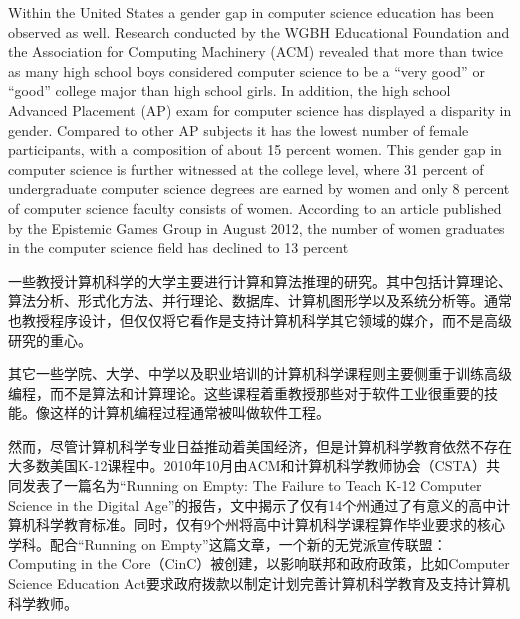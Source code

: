 Within the United States a gender gap in computer science education has been observed as well. Research conducted by the WGBH Educational Foundation and the Association for Computing Machinery (ACM) revealed that more than twice as many high school boys considered computer science to be a “very good” or “good” college major than high school girls. In addition, the high school Advanced Placement (AP) exam for computer science has displayed a disparity in gender. Compared to other AP subjects it has the lowest number of female participants, with a composition of about 15 percent women. This gender gap in computer science is further witnessed at the college level, where 31 percent of undergraduate computer science degrees are earned by women and only 8 percent of computer science faculty consists of women. According to an article published by the Epistemic Games Group in August 2012, the number of women graduates in the computer science field has declined to 13 percent


一些教授计算机科学的大学主要进行计算和算法推理的研究。其中包括计算理论、算法分析、形式化方法、并行理论、数据库、计算机图形学以及系统分析等。通常也教授程序设计，但仅仅将它看作是支持计算机科学其它领域的媒介，而不是高级研究的重心。


其它一些学院、大学、中学以及职业培训的计算机科学课程则主要侧重于训练高级编程，而不是算法和计算理论。这些课程着重教授那些对于软件工业很重要的技能。像这样的计算机编程过程通常被叫做软件工程。

然而，尽管计算机科学专业日益推动着美国经济，但是计算机科学教育依然不存在大多数美国K-12课程中。2010年10月由ACM和计算机科学教师协会（CSTA）共同发表了一篇名为“Running on Empty: The Failure to Teach K-12 Computer Science in the Digital Age”的报告，文中揭示了仅有14个州通过了有意义的高中计算机科学教育标准。同时，仅有9个州将高中计算机科学课程算作毕业要求的核心学科。配合“Running on Empty”这篇文章，一个新的无党派宣传联盟：Computing in the Core（CinC）被创建，以影响联邦和政府政策，比如Computer Science Education Act要求政府拨款以制定计划完善计算机科学教育及支持计算机科学教师。



